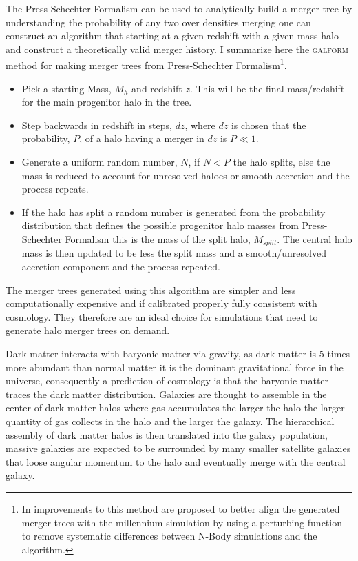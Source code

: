 The Press-Schechter Formalism can be used to analytically build a merger tree by understanding the probability of any two over densities merging one can construct an algorithm that starting at a given redshift with a given mass halo and construct a theoretically valid merger history. I summarize here the \textsc{galform} \citep{Cole2000} method for making merger trees from Press-Schechter Formalism\footnote{In \citet{Parkinson2008GeneratingTrees} improvements to this method are proposed to better align the generated merger trees with the millennium simulation by using a perturbing function to remove systematic differences between N-Body simulations and the algorithm.}.

\begin{itemize}
    \item Pick a starting Mass, $M_{h}$ and redshift $z$. This will be the final mass/redshift for the main progenitor halo in the tree.
    \item Step backwards in redshift in steps, $dz$, where $dz$ is chosen that the probability, $P$, of a halo having a merger in $dz$ is $P\ll1$.
    \item Generate a uniform random number, $N$, if $N<P$ the halo splits, else the mass is reduced to account for unresolved haloes or smooth accretion and the process repeats.
    \item If the halo has split a random number is generated from the probability distribution that defines the possible progenitor halo masses from  Press-Schechter Formalism this is the mass of the split halo, $M_{split}$. The central halo mass is then updated to be less the split mass and a smooth/unresolved accretion component and the process repeated.
\end{itemize}

The merger trees generated using this algorithm are simpler and less computationally expensive and if calibrated properly fully consistent with \LCDM cosmology. They therefore are an ideal choice for simulations that need to generate halo merger trees on demand.

Dark matter interacts with baryonic matter via gravity, as dark matter is 5 times more abundant than normal matter it is the dominant gravitational force in the universe, consequently a prediction of \LCDM cosmology is that the baryonic matter traces the dark matter distribution. Galaxies are thought to assemble in the center of dark matter halos where gas accumulates the larger the halo the larger quantity of gas collects in the halo and the larger the galaxy. The hierarchical assembly of dark matter halos is then translated into the galaxy population, massive galaxies are expected to be surrounded by many smaller satellite galaxies that loose angular momentum to the halo and eventually merge with the central galaxy.

